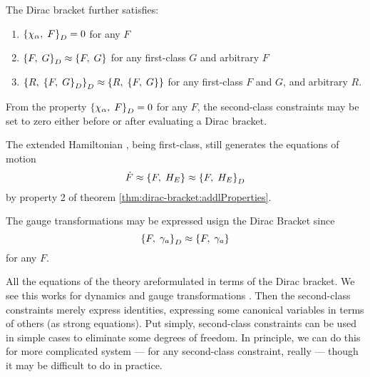 \begin{theorem}\label{thm:dirac-bracket:addlProperties}
The Dirac bracket further satisfies:
\begin{enumerate}
\item $\left\{\chi_{\alpha},\;F\right\}_{D}=0$ for any $F$
\item $\left\{F,\;G\right\}_{D}\approx\left\{F,\;G\right\}$ for any
first-class $G$ and arbitrary $F$
\item
$\left\{R,\;\left\{F,\;G\right\}_{D}\right\}_{D}\approx\left\{R,\;\left\{F,\;G\right\}\right\}$
for any first-class $F$ and $G$, and arbitrary $R$.
\end{enumerate}
\end{theorem}

\M
From the property $\left\{\chi_{\alpha},\;F\right\}_{D}=0$
for any $F$, the second-class constraints may be set to zero either
before or after evaluating a Dirac bracket.

\M\label{M:dirac-bracket:dynamics}
The extended Hamiltonian , being
first-class, still generates the equations of motion
\begin{equation}
\dot{F}\approx\left\{F,\;H_{E}\right\}
\approx\left\{F,\;H_{E}\right\}_{D}
\end{equation}
by property 2 of theorem \ref{thm:dirac-bracket:addlProperties}.

\M\label{M:dirac-bracket:gauge-transformations}
The gauge transformations may be expressed usign the Dirac Bracket since
\begin{equation}
\left\{F,\;\gamma_{a}\right\}_{D}\approx\left\{F,\;\gamma_{a}\right\}
\end{equation}
for any $F$.

All the equations of the theory areformulated in terms of the Dirac
bracket. We see this works for dynamics 
and gauge
transformations . Then the
second-class constraints merely express identities, expressing some
canonical variables in terms of others (as strong equations). Put
simply, second-class constraints can be used in simple cases to
eliminate some degrees of freedom. In principle, we can do this for more
complicated system --- for any second-class constraint, really ---
though it may be difficult to do in practice.

